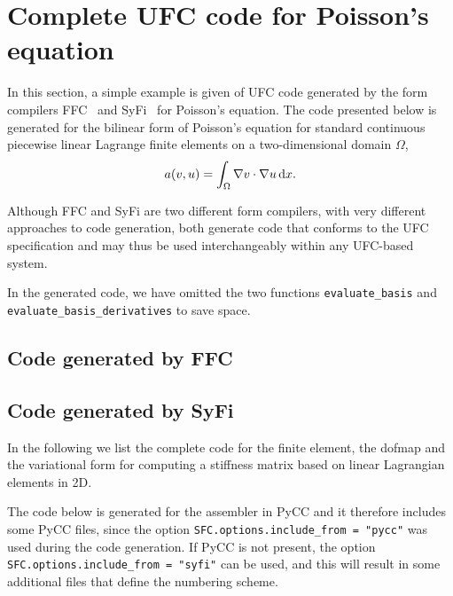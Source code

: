 \chapter{Complete UFC code for Poisson's equation}

In this section, a simple example is given of UFC code generated by
the form compilers
FFC~\cite{www:ffc,logg:article:07,logg:article:09,logg:article:10,logg:article:11}
and SyFi~\cite{www:syfi} for Poisson's equation. The code presented
below is generated for the bilinear form of Poisson's equation for
standard continuous piecewise linear Lagrange finite elements on a
two-dimensional domain $\Omega$,
\begin{equation}
  a(v, u) = \int_{\Omega} \nabla v \cdot \nabla u \, \mathrm{d}x.
\end{equation}

Although FFC and SyFi are two different form compilers, with very
different approaches to code generation, both generate code that
conforms to the UFC specification and may thus be used interchangeably
within any UFC-based system.

In the generated code, we have omitted the two functions
\texttt{evaluate\_basis} and
\texttt{evaluate\_basis\_derivatives}\footnotemark{} to save space.


\section{Code generated by FFC}

\scriptsize
{}
\normalsize

\section{Code generated by SyFi}

In the following we list the complete code for the finite element, 
the dofmap and the variational form for computing a stiffness matrix
based on linear Lagrangian elements in 2D. 

The code below is generated for the assembler in PyCC and it therefore
includes some PyCC files, since the option \texttt{SFC.options.include\_from = "pycc"} was used during the code generation. If PyCC is not present, the option \texttt{SFC.options.include\_from = "syfi"} can be used, and this will result in some additional files that define the numbering scheme.    

